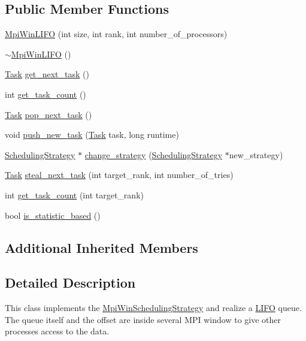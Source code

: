 \subsection*{Public Member Functions}
\begin{DoxyCompactItemize}
\item 
\hyperlink{class_mpi_win_l_i_f_o_a46a7cbb4d81782b9ff7dbd971e5eb9ca}{Mpi\+Win\+L\+I\+F\+O} (int size, int rank, int number\+\_\+of\+\_\+processors)
\item 
\hyperlink{class_mpi_win_l_i_f_o_a39fbceec3a4fb97990a31ff556ce8ff5}{$\sim$\+Mpi\+Win\+L\+I\+F\+O} ()
\item 
\hyperlink{_types_8h_a0c77930ab3818a1680c59353f627fba8}{Task} \hyperlink{class_mpi_win_l_i_f_o_a6de2bf8f36458582ebc800f2beda94c6}{get\+\_\+next\+\_\+task} ()
\item 
int \hyperlink{class_mpi_win_l_i_f_o_aeb679863632de7367029fded90eb4e5f}{get\+\_\+task\+\_\+count} ()
\item 
\hyperlink{_types_8h_a0c77930ab3818a1680c59353f627fba8}{Task} \hyperlink{class_mpi_win_l_i_f_o_a93c2fdd8d75ce1264329edfa48d8864a}{pop\+\_\+next\+\_\+task} ()
\item 
void \hyperlink{class_mpi_win_l_i_f_o_a1336e4abb196dc1f3eba6e7e29f969aa}{push\+\_\+new\+\_\+task} (\hyperlink{_types_8h_a0c77930ab3818a1680c59353f627fba8}{Task} task, long runtime)
\item 
\hyperlink{class_scheduling_strategy}{Scheduling\+Strategy} $\ast$ \hyperlink{class_mpi_win_l_i_f_o_aa33f53bcf71ee26ff20039916cb321cd}{change\+\_\+strategy} (\hyperlink{class_scheduling_strategy}{Scheduling\+Strategy} $\ast$new\+\_\+strategy)
\item 
\hyperlink{_types_8h_a0c77930ab3818a1680c59353f627fba8}{Task} \hyperlink{class_mpi_win_l_i_f_o_a0631b1fc2042f19a5b438c8cfa44934a}{steal\+\_\+next\+\_\+task} (int target\+\_\+rank, int number\+\_\+of\+\_\+tries)
\item 
int \hyperlink{class_mpi_win_l_i_f_o_a4825ff8faf740b1f9e984813c20455ec}{get\+\_\+task\+\_\+count} (int target\+\_\+rank)
\item 
bool \hyperlink{class_mpi_win_l_i_f_o_ae65b1f7b9a7e5c8a2feaceafca0dd129}{is\+\_\+statistic\+\_\+based} ()
\end{DoxyCompactItemize}
\subsection*{Additional Inherited Members}


\subsection{Detailed Description}
This class implements the \hyperlink{class_mpi_win_scheduling_strategy}{Mpi\+Win\+Scheduling\+Strategy} and realize a \hyperlink{class_l_i_f_o}{L\+I\+F\+O} queue. The queue itself and the offset are inside several M\+P\+I window to give other processes access to the data.


